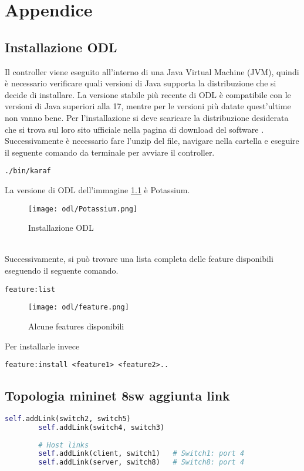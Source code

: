 \chapter{Appendice}

\section {Installazione ODL}
Il controller viene eseguito all'interno di una Java Virtual Machine (JVM), quindi è necessario verificare quali versioni di Java supporta la distribuzione che si decide di installare.
La versione stabile più recente di ODL è compatibile con le versioni di Java superiori alla 17, mentre per le versioni più datate quest'ultime non vanno bene. 
Per l'installazione si deve scaricare la distribuzione desiderata che si trova sul loro sito ufficiale nella pagina di download del software \cite{InstallODL}.
Successivamente è necessario fare l'unzip del file, navigare nella cartella e eseguire il seguente comando da terminale per avviare il controller.
\begin{lstlisting}[language=CLI]
./bin/karaf
\end{lstlisting}
La versione di ODL dell'immagine \ref{fig:installazione} è Potassium.
\begin{figure}[h]
    \centering
   \texttt{[image: odl/Potassium.png]}
    \caption{Installazione ODL}
    \label{fig:installazione}
\end{figure}
\\Successivamente, si può trovare una lista completa delle feature disponibili eseguendo il seguente comando.
\begin{lstlisting}[language=CLI]
feature:list
\end{lstlisting}
\begin{figure}[h]
    \centering
   \texttt{[image: odl/feature.png]}
    \caption{Alcune features disponibili}
    \label{fig:feature}
\end{figure}
Per installarle invece 
\begin{lstlisting}[language=CLI]
feature:install <feature1> <feature2>..
\end{lstlisting}

\section{Topologia mininet 8sw aggiunta link}
\begin{lstlisting}[language=Python]
        self.addLink(switch2, switch5) 
        self.addLink(switch4, switch3)  
        
        # Host links
        self.addLink(client, switch1)   # Switch1: port 4
        self.addLink(server, switch8)   # Switch8: port 4
\end{lstlisting}
